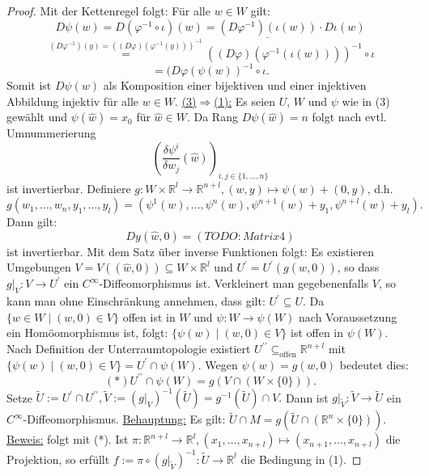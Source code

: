 \documentclass[a4paper,11pt,notitlepage]{report}
\newcommand{\R}{{\ensuremath{\mathbb{R}}}}
\begin{document}
\begin{proof}
		 Mit der Kettenregel folgt: Für alle $w \in W$ gilt:
		 $$D \psi(w) = D(\varphi^{-1} \circ \iota)(w) = \underline{(D \varphi^{-1}) (\iota(w))} \cdot D\iota (w)$$ 
		 $$\overset{(D \varphi^{-1})(y) = ((D \varphi)(\varphi^{-1}(y)))^{-1}}{=} ((D \varphi) (\varphi^{-1}(\iota(w))))^{-1} \circ \iota$$
		 $$= (D \varphi ( \psi(w))^{-1} \circ \iota.$$
		 Somit ist $D \psi(w)$ als Komposition einer bijektiven und einer injektiven Abbildung injektiv für alle $w \in W$.
		 \newline
		 \underline{(3)$\Rightarrow$(1):} Es seien $U$, $W$ und $\psi$ wie in (3) gewählt und $\psi(\hat{w})= x_0$ für $\hat{w} \in W$.
		 Da Rang $D \psi(\hat{w}) = n$ folgt nach evtl. Umnummerierung
		 $$\left(\frac{\delta \psi^i}{\delta w_j}(\hat{w})\right)_{i,j \in \{1, \ldots, n\}}$$ ist invertierbar.
		 Definiere $g \colon W \times \R^l \rightarrow \R^{n+l}, (w,y) \mapsto \psi(w) + (0,y)$, d.h. $g(w_1, \ldots,w_n,y_1,\ldots,y_l) = (\psi^1(w), \ldots, \psi^n(w), \psi^{n+1}(w)+y_1, \psi^{n+l}(w)+y_l).$
		 Dann gilt: 
		 $$Dy(\hat{w},0)= (TODO:Matrix 4)$$ ist invertierbar.
		 Mit dem Satz über inverse Funktionen folgt:
		 Es existieren Umgebungen $V = V((\hat{w},0)) \subseteq W \times \R^l$ und $U^\prime = U^\prime(g(\hat{w},0))$, so dass $g \big |_V \colon V \rightarrow U^\prime$ ein $C^\infty$-Diffeomorphismus ist. \newline
		 Verkleinert man gegebenenfalls $V$, so kann man ohne Einschränkung annehmen, dass gilt: $U^\prime \subseteq U$.
		 Da $\{w \in W \mid (w,0) \in V\}$ offen ist in $W$ und $\psi \colon W \rightarrow \psi(W)$ nach Voraussetzung ein Homöomorphismus ist, folgt: $\{\psi(w) \mid (w,0) \in V\}$ ist offen in $\psi(W)$.
		 \newline
		 Nach Definition der Unterraumtopologie existiert $U^{\prime\prime} \subseteq_{\text{offen}} \R^{n+l}$ mit $\{\psi(w)\mid(w,0) \in V\} = U^\prime \cap \psi(W)$.
		 \newline
		 Wegen $\psi(w)=g(w,0)$ bedeutet dies:
		 $$(*) U^{\prime\prime} \cap \psi(W) = g(V \cap(W \times \{0\})).$$
		 Setze $\tilde{U} := U^\prime \cap U^{\prime\prime}, \tilde{V} := (g \big |_V)^{-1}(\tilde{U}) = g^{-1}(\tilde{U}) \cap V.$
		 Dann ist $g \big |_{\tilde{V}} \colon \tilde{V} \rightarrow \tilde{U}$ ein $C^\infty$-Diffeomorphismus.
		 \newline
		 \underline{Behauptung:} Es gilt: $\tilde{U} \cap M = g(\tilde{U} \cap (\R^n \times \{0\}))$. 
		 \newline
		 \underline{Beweis:} folgt mit (*).
		 \newline
		 Ist $\pi \colon \R^{n+l} \rightarrow \R^l, (x_1, \ldots, x_{n+l}) \mapsto (x_{n+1}, \ldots, x_{n+l})$ die Projektion, so erfüllt $f := \pi \circ (g \big |_{\tilde{V}})^{-1} \colon \tilde{U} \rightarrow \R^l$ die Bedingung in (1).
\end{proof}
\end{document}
